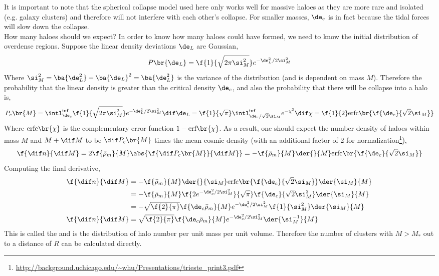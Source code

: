 \documentclass{article}
\begin{document}
It is important to note that the spherical collapse model used here only works well for massive haloes as they are more rare and isolated (e.g. galaxy clusters) and therefore will not interfere with each other's collapse. For smaller masses, $\de_c$ is in fact  because the tidal forces will slow down the collapse.\\

How many haloes should we expect? In order to know how many haloes could have formed, we need to know the initial distribution of overdense regions. Suppose the linear density deviations $\de_{L}$ are Gaussian,
\[ P\br{\de_L} = \f{1}{\sqrt{2 \pi \si_{M}^2}}e^{-{\de_L^2}/{2 \si_M^2}} \]
Where $\si_M^2 = \ba{\de_L^2} - \ba{\de_L}^2 = \ba{\de_L^2}$ is the variance of the distribution (and is dependent on mass $M$). Therefore the probability that the linear density is greater than the critical density $\de_c$, and also the probability that there will be collapse into a halo is,
\[ P_c\br{M} = \intl_{\de_c}^{\inf} \f{1}{\sqrt{2 \pi \si_{M}^2}}e^{-{\de_L^2}/{2 \si_M^2}} \dif \de_L = \f{1}{\sqrt{\pi}}\intl_{{\de_c / \sqrt{2} \si_M}}^{\inf} e^{-\chi^2} \dif \chi = \f{1}{2} \text{erfc}\br{\f{\de_c}{\sqrt{2} \si_M}}\]
Where $\text{erfc}\br{\chi}$ is the complementary error function $1 - \text{erf}\br{\chi}$. As a result, one should expect the number density of haloes within mass $M$ and $M + \dif M$ to be $\dif P_c\br{M}$ times the mean cosmic density (with an additional factor of $2$ for normalization\footnote{\url{http://background.uchicago.edu/~whu/Presentations/trieste_print3.pdf}}),
\[ \f{\dif n}{\dif M} = 2 \f{\bar \rho_m}{M} \abs{\f{\dif P_c\br{M}}{\dif M}} = -\f{\bar \rho_m}{M}\der{}{M}\text{erfc}\br{\f{\de_c}{\sqrt{2} \si_M}} \]
Computing the final derivative,
\begin{align*}
\f{\dif n}{\dif M}
&= -\f{\bar \rho_m}{M}\der{}{\si_M}\text{erfc}\br{\f{\de_c}{\sqrt{2} \si_M}}\der{\si_M}{M} \\
&= -\f{\bar \rho_m}{M}\f{2e^{-{\de_c^2}/{2 \si_M^2}}}{\sqrt{\pi}}\f{\de_c}{\sqrt{2} \si_M^2}\der{\si_M}{M} \\
&= -\sqrt{\f{2}{\pi}}\f{\de_c\bar \rho_m}{M} e^{-{\de_c^2}/{2 \si_M^2}} \f{1}{\si_M^2} \der{\si_M}{M} \\
\f{\dif n}{\dif M} &= \sqrt{\f{2}{\pi}}\f{\de_c\bar \rho_m}{M} e^{-{\de_c^2}/{2 \si_M^2}} \der{\si_M^{-1}}{M}
\end{align*}
This is called the  and is the distribution of halo number per unit mass per unit volume. Therefore the number of clusters with $M > M_{*}$ out to a distance of $R$ can be calculated directly.
\end{document}
